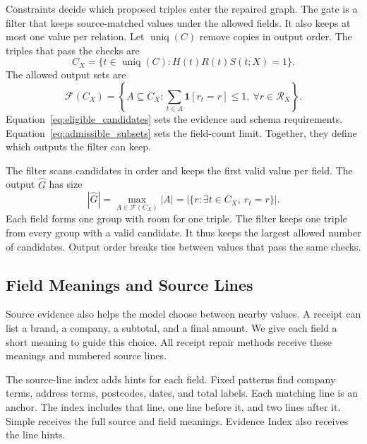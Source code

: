Constraints decide which proposed triples enter the repaired graph.
The gate is a filter that keeps source-matched values under the allowed fields.
It also keeps at most one value per relation.
Let $\operatorname{uniq}(C)$ remove copies in output order.
The triples that pass the checks are
\begin{equation}
    \label{eq:eligible_candidates}
    C_X=\{t\in\operatorname{uniq}(C):H(t)R(t)S(t;X)=1\}.
\end{equation}
The allowed output sets are
\begin{equation}
    \label{eq:admissible_subsets}
    \mathcal F(C_X)=\left\{A\subseteq C_X:
    \sum_{t\in A}\mathbf1[r_t=r]\leq1,\ \forall r\in\mathcal R_X\right\}.
\end{equation}
Equation~\ref{eq:eligible_candidates} sets the evidence and schema requirements.
Equation~\ref{eq:admissible_subsets} sets the field-count limit.
Together, they define which outputs the filter can keep.

The filter scans candidates in order and keeps the first valid value per field.
The output $\widehat G$ has size
\begin{equation}
    \label{eq:selection_size}
    |\widehat G|=\max_{A\in\mathcal F(C_X)}|A|
    =|\{r:\exists t\in C_X,\ r_t=r\}|.
\end{equation}
Each field forms one group with room for one triple.
The filter keeps one triple from every group with a valid candidate.
It thus keeps the largest allowed number of candidates.
Output order breaks ties between values that pass the same checks.

\subsection{Field Meanings and Source Lines}
\label{sec:framework:field_evidence}

Source evidence also helps the model choose between nearby values.
A receipt can list a brand, a company, a subtotal, and a final amount.
We give each field a short meaning to guide this choice.
All receipt repair methods receive these meanings and numbered source lines.

The source-line index adds hints for each field.
Fixed patterns find company terms, address terms, postcodes, dates, and total labels.
Each matching line is an anchor.
The index includes that line, one line before it, and two lines after it.
Simple receives the full source and field meanings.
Evidence Index also receives the line hints.

